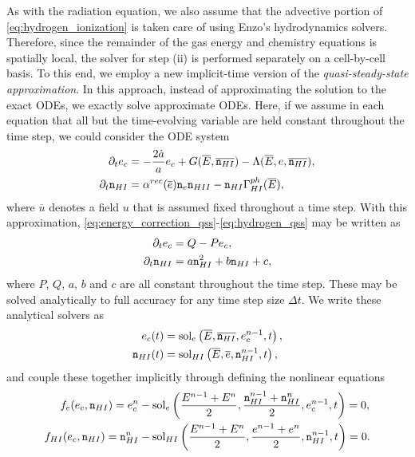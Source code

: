 \documentclass[letterpaper,10pt]{article}
\renewcommand{\(}{\left(}
\renewcommand{\)}{\right)}
\newcommand{\dt}{\Delta t}
\newcommand{\mn}{{\tt n}}
\begin{document}
As with the radiation equation, we also assume that the advective
portion of \eqref{eq:hydrogen_ionization} is taken care of using
Enzo's hydrodynamics solvers.  Therefore, since the remainder of the
gas energy and chemistry equations is spatially local, the solver for
step (ii) is performed separately on a cell-by-cell basis.  To this
end, we employ a new implicit-time version of the 
{\em quasi-steady-state approximation}.  In this approach, instead of
approximating the solution to the exact ODEs, we exactly solve
approximate ODEs.  Here, if we assume in each equation that all but the
time-evolving variable are held constant throughout the time step, we
could consider the ODE system 
\begin{align}
  \label{eq:energy_correction_qss}
  \partial_t e_c &= -\frac{2\dot{a}}{a}e_c + G(\overline{E},\overline{\mn_{HI}}) - \Lambda(\overline{E},e,\overline{\mn_{HI}}), \\
  \label{eq:hydrogen_qss}
  \partial_t \mn_{HI} &= \alpha^{rec}(\overline{e}) \mn_e \mn_{HII} - \mn_{HI} \Gamma_{HI}^{ph}(\overline{E}),
\end{align}
where $\overline{u}$ denotes a field $u$ that is assumed fixed
throughout a time step.  With this approximation,
\eqref{eq:energy_correction_qss}-\eqref{eq:hydrogen_qss} may be
written as
\begin{align}
  \label{eq:energy_correction_qss2}
  \partial_t e_c &= Q - Pe_c, \\
  \label{eq:hydrogen_qss2}
  \partial_t \mn_{HI} &= a \mn_{HI}^2 + b\mn_{HI} + c,
\end{align}
where $P$, $Q$, $a$, $b$ and $c$ are all constant throughout the time
step.  These may be solved analytically to full accuracy for any time step
size $\dt$.  We write these analytical solvers as
\begin{align}
  \label{eq:energy_correction_qss3}
  e_c(t) &= \text{sol}_e\left(\overline{E},\overline{\mn_{HI}},e_c^{n-1},t\right), \\
  \label{eq:hydrogen_qss3}
  \mn_{HI}(t) &= \text{sol}_{HI}\left(\overline{E},\overline{e},\mn_{HI}^{n-1},t\right),
\end{align}
and couple these together implicitly through defining the nonlinear
equations 
\begin{align}
  \label{eq:energy_correction_iqss}
  f_e(e_c,\mn_{HI}) = e_c^n &- \text{sol}_e\left(\frac{E^{n-1}+E^n}{2},\frac{\mn_{HI}^{n-1}+\mn_{HI}^n}{2},e_c^{n-1},t\right) = 0, \\
  \label{eq:hydrogen_iqss}
  f_{HI}(e_c,\mn_{HI}) = \mn_{HI}^n &- \text{sol}_{HI}\left(\frac{E^{n-1}+E^n}{2},\frac{e^{n-1}+e^n}{2},\mn_{HI}^{n-1},t\right) = 0.
\end{align}
\end{document}
